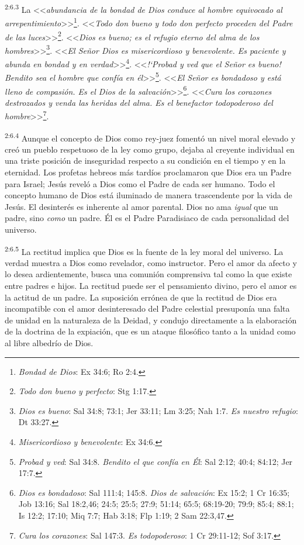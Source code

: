 \par
\textsuperscript{2:6.3} La <<\textit{abundancia de la bondad de Dios conduce al hombre equivocado al arrepentimiento}>>\footnote{\textit{Bondad de Dios}: Ex 34:6; Ro 2:4.}. <<\textit{Todo don bueno y todo don perfecto proceden del Padre de las luces}>>\footnote{\textit{Todo don bueno y perfecto}: Stg 1:17.}. <<\textit{Dios es bueno; es el refugio eterno del alma de los hombres}>>\footnote{\textit{Dios es bueno}: Sal 34:8; 73:1; Jer 33:11; Lm 3:25; Nah 1:7. \textit{Es nuestro refugio}: Dt 33:27.}. <<\textit{El Señor Dios es misericordioso y benevolente. Es paciente y abunda en bondad y en verdad}>>\footnote{\textit{Misericordioso y benevolente}: Ex 34:6.}. <<\textit{!`Probad y ved que el Señor es bueno! Bendito sea el hombre que confía en él}>>\footnote{\textit{Probad y ved}: Sal 34:8. \textit{Bendito el que confía en Él}: Sal 2:12; 40:4; 84:12; Jer 17:7.}. <<\textit{El Señor es bondadoso y está lleno de compasión. Es el Dios de la salvación}>>\footnote{\textit{Dios es bondadoso}: Sal 111:4; 145:8. \textit{Dios de salvación}: Ex 15:2; 1 Cr 16:35; Job 13:16; Sal 18:2,46; 24:5; 25:5; 27:9; 51:14; 65:5; 68:19-20; 79:9; 85:4; 88:1; Is 12:2; 17:10; Miq 7:7; Hab 3:18; Flp 1:19; 2 Sam 22:3,47.}. <<\textit{Cura los corazones destrozados y venda las heridas del alma. Es el benefactor todopoderoso del hombre}>>\footnote{\textit{Cura los corazones}: Sal 147:3. \textit{Es todopoderoso}: 1 Cr 29:11-12; Sof 3:17.}.

\par
\textsuperscript{2:6.4} Aunque el concepto de Dios como rey-juez fomentó un nivel moral elevado y creó un pueblo respetuoso de la ley como grupo, dejaba al creyente individual en una triste posición de inseguridad respecto a su condición en el tiempo y en la eternidad. Los profetas hebreos más tardíos proclamaron que Dios era un Padre para Israel; Jesús reveló a Dios como el Padre de cada ser humano. Todo el concepto humano de Dios está iluminado de manera trascendente por la vida de Jesús. El desinterés es inherente al amor parental. Dios no ama \textit{igual} que un padre, sino \textit{como} un padre. Él es el Padre Paradisiaco de cada personalidad del universo.

\par
\textsuperscript{2:6.5} La rectitud implica que Dios es la fuente de la ley moral del universo. La verdad muestra a Dios como revelador, como instructor. Pero el amor da afecto y lo desea ardientemente, busca una comunión comprensiva tal como la que existe entre padres e hijos. La rectitud puede ser el pensamiento divino, pero el amor es la actitud de un padre. La suposición errónea de que la rectitud de Dios era incompatible con el amor desinteresado del Padre celestial presuponía una falta de unidad en la naturaleza de la Deidad, y condujo directamente a la elaboración de la doctrina de la expiación, que es un ataque filosófico tanto a la unidad como al libre albedrío de Dios.

